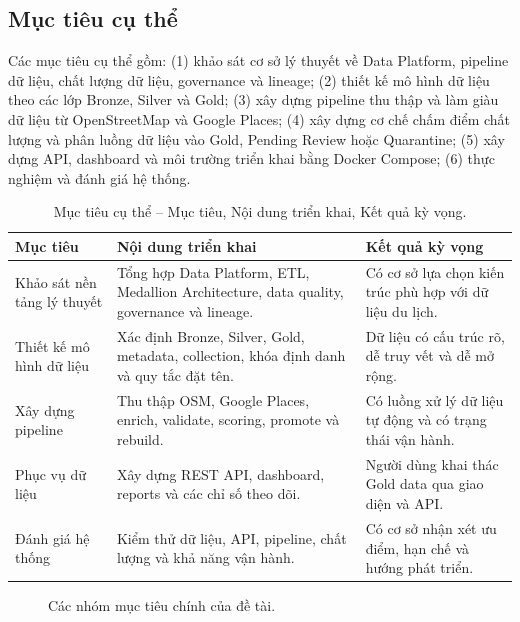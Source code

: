 \documentclass[12pt,a4paper]{article}
\begin{document}
\subsection{Mục tiêu cụ thể}

Các mục tiêu cụ thể gồm: (1) khảo sát cơ sở lý thuyết về Data Platform, pipeline dữ liệu, chất lượng dữ liệu, governance và lineage; (2) thiết kế mô hình dữ liệu theo các lớp Bronze, Silver và Gold; (3) xây dựng pipeline thu thập và làm giàu dữ liệu từ OpenStreetMap và Google Places; (4) xây dựng cơ chế chấm điểm chất lượng và phân luồng dữ liệu vào Gold, Pending Review hoặc Quarantine; (5) xây dựng API, dashboard và môi trường triển khai bằng Docker Compose; (6) thực nghiệm và đánh giá hệ thống.

\begin{longtable}{@{}p{}p{}p{}@{}}
\caption{Mục tiêu cụ thể -- Mục tiêu, Nội dung triển khai, Kết quả kỳ vọng.}\\
\toprule
\textbf{Mục tiêu} & \textbf{Nội dung triển khai} & \textbf{Kết quả kỳ vọng} \\
\midrule
Khảo sát nền tảng lý thuyết & Tổng hợp Data Platform, ETL, Medallion Architecture, data quality, governance và lineage. & Có cơ sở lựa chọn kiến trúc phù hợp với dữ liệu du lịch. \\
Thiết kế mô hình dữ liệu & Xác định Bronze, Silver, Gold, metadata, collection, khóa định danh và quy tắc đặt tên. & Dữ liệu có cấu trúc rõ, dễ truy vết và dễ mở rộng. \\
Xây dựng pipeline & Thu thập OSM, Google Places, enrich, validate, scoring, promote và rebuild. & Có luồng xử lý dữ liệu tự động và có trạng thái vận hành. \\
Phục vụ dữ liệu & Xây dựng REST API, dashboard, reports và các chỉ số theo dõi. & Người dùng khai thác Gold data qua giao diện và API. \\
Đánh giá hệ thống & Kiểm thử dữ liệu, API, pipeline, chất lượng và khả năng vận hành. & Có cơ sở nhận xét ưu điểm, hạn chế và hướng phát triển. \\
\bottomrule
\end{longtable}

\begin{figure}[htbp]
\centering
{}
\caption{Các nhóm mục tiêu chính của đề tài.}
\end{figure}
\end{document}
